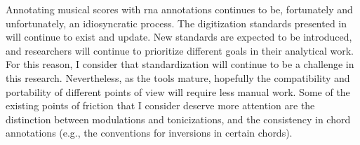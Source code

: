 
Annotating musical scores with \gls{rna} annotations
continues to be, fortunately and unfortunately, an
idiosyncratic process. The digitization standards presented
in  will
continue to exist and update. New standards are expected to
be introduced, and researchers will continue to prioritize
different goals in their analytical work. For this reason, I
consider that standardization will continue to be a
challenge in this research. Nevertheless, as the tools
mature, hopefully the compatibility and portability of
different points of view will require less manual work. Some
of the existing points of friction that I consider deserve
more attention are the distinction between modulations and
tonicizations, and the consistency in chord annotations
(e.g., the conventions for inversions in certain chords).
